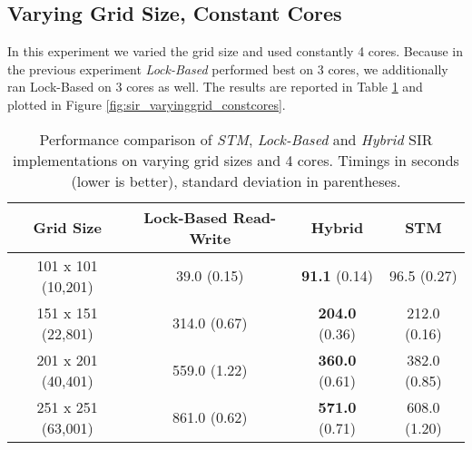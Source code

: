 
\subsection{Varying Grid Size, Constant Cores}
In this experiment we varied the grid size and used constantly 4 cores. Because in the previous experiment \textit{Lock-Based} performed best on 3 cores, we additionally ran Lock-Based on 3 cores as well. %
The results are reported in Table \ref{tab:sir_varyinggrid_constcores} and plotted in Figure \ref{fig:sir_varyinggrid_constcores}.

\begin{table}
	\centering
  	\begin{tabular}{ c || c | c | c  }
        Grid Size           & Lock-Based Read-Write & Hybrid                 & STM            \\ \hline \hline 
   		101 x 101 (10,201)  & 39.0 (0.15)           & \textbf{91.1} (0.14)   & 96.5 (0.27)    \\ \hline
   		151 x 151 (22,801)  & 314.0 (0.67)          & \textbf{204.0} (0.36)  & 212.0 (0.16)   \\ \hline
   		201 x 201 (40,401)  & 559.0 (1.22)          & \textbf{360.0} (0.61)  & 382.0 (0.85)   \\ \hline
   		251 x 251 (63,001)  & 861.0 (0.62)          & \textbf{571.0} (0.71)  & 608.0 (1.20)   \\ \hline \hline
  	\end{tabular}

  	\caption{Performance comparison of \textit{STM}, \textit{Lock-Based} and \textit{Hybrid} SIR implementations on varying grid sizes and 4 cores. Timings in seconds (lower is better), standard deviation in parentheses.}
	\label{tab:sir_varyinggrid_constcores}
\end{table}

